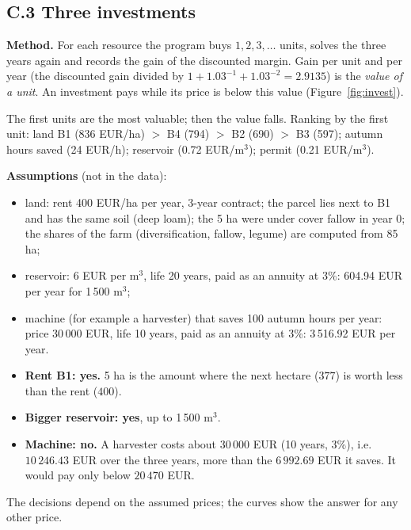 \subsection*{C.3 \quad Three investments}

\textbf{Method.} For each resource the program buys $1,2,3,\dots$ units, solves the three years again and records the gain of the discounted margin. Gain per unit and per year (the discounted gain divided by $1+1.03^{-1}+1.03^{-2}=2.9135$) is the \emph{value of a unit}. An investment pays while its price is below this value (Figure~\ref{fig:invest}).



The first units are the most valuable; then the value falls. Ranking by the first unit: land B1 (836 EUR/ha) $>$ B4 (794) $>$ B2 (690) $>$ B3 (597); autumn hours saved (24 EUR/h); reservoir (0.72 EUR/m$^3$); permit (0.21 EUR/m$^3$).

\textbf{Assumptions} (not in the data):
\begin{itemize}
\item land: rent 400 EUR/ha per year, 3-year contract; the parcel lies next to B1 and has the same soil (deep loam); the 5 ha were under cover fallow in year 0; the shares of the farm (diversification, fallow, legume) are computed from 85 ha;
\item reservoir: 6 EUR per m$^3$, life 20 years, paid as an annuity at 3\%: 604.94 EUR per year for 1\,500 m$^3$;
\item machine (for example a harvester) that saves 100 autumn hours per year: price 30\,000 EUR, life 10 years, paid as an annuity at 3\%: 3\,516.92 EUR per year.
\end{itemize}



\begin{itemize}
\item \textbf{Rent B1: yes.} 5 ha is the amount where the next hectare ($377$) is worth less than the rent ($400$).
\item \textbf{Bigger reservoir: yes}, up to 1\,500 m$^3$.
\item \textbf{Machine: no.} A harvester costs about 30\,000 EUR (10 years, 3\%), i.e.\ $10\,246.43$ EUR over the three years, more than the $6\,992.69$ EUR it saves. It would pay only below $20\,470$ EUR.
\end{itemize}
The decisions depend on the assumed prices; the curves show the answer for any other price.
